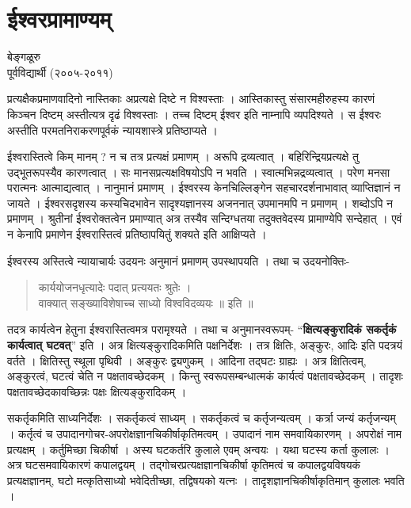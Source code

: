 \chapter{ईश्वरप्रामाण्यम्}

\begin{center}
\smallskip

बेङ्गळूरु\\
पूर्वविद्यार्थी (२००५-२०११)
\end{center}
प्रत्यक्षैकप्रमाणवादिनो नास्तिकाः अप्रत्यक्षे दिष्टे न विश्वस्ताः । आस्तिकास्तु संसारमहीरुहस्य कारणं किञ्चन दिष्टम् अस्तीत्यत्र दृढं विश्वस्ताः । तच्च दिष्टम् ईश्वर इति नाम्नापि व्यपदिश्यते । स ईश्वरः अस्तीति परमतनिराकरणपूर्वकं न्यायशास्त्रे प्रतिष्ठाप्यते ।

ईश्वरास्तित्वे किम् मानम् ? न च तत्र प्रत्यक्षं प्रमाणम् । अरूपि द्रव्यत्वात् । बहिरिन्द्रियप्रत्यक्षे तु उद्भूतरूपस्यैव कारणत्वात् । सः मानसप्रत्यक्षविषयोऽपि न भवति । स्वात्मभिन्नद्रव्यत्वात् । परेण मनसा परात्मनः आत्माद्यत्वात् । नानुमानं प्रमाणम् । ईश्वरस्य केनचिल्लिङ्गेन सहचारदर्शनाभावात् व्याप्तिज्ञानं न जायते । ईश्वरसदृशस्य कस्यचिदभावेन सादृश्यज्ञानस्य अजननात् उपमानमपि न प्रमाणम् । शब्दोऽपि न प्रमाणम् । श्रुतीनां ईश्वरोक्तत्वेन प्रमाण्यात् अत्र तस्यैव सन्दिग्धतया तदुक्तवेदस्य प्रामाण्येपि सन्देहात् । एवं न केनापि प्रमाणेन ईश्वरास्तित्वं प्रतिष्ठापयितुं शक्यते इति आक्षिप्यते ।

ईश्वरस्य अस्तित्वे न्यायाचार्यः उदयनः अनुमानं प्रमाणम् उपस्थापयति । तथा च उदयनोक्तिः-
\begin{verse}
कार्ययोजनधृत्यादेः पदात् प्रत्ययतः श्रुतेः ।\\
वाक्यात् सङ्ख्याविशेषाच्च साध्यो विश्वविदव्ययः ॥ इति ॥
\end{verse}
तदत्र कार्यत्वेन हेतुना ईश्वरास्तित्वमत्र परामृश्यते । तथा च अनुमानस्वरूपम्- “\textbf{क्षित्यङ्कुरादिकं सकर्तृकं कार्यत्वात् घटवत्}” इति । अत्र क्षित्यङ्कुरादिकमिति पक्षनिर्देशः । तत्र क्षितिः, अङ्कुरः, आदिः इति पदत्रयं वर्तते । क्षितिस्तु स्थूला पृथिवी । अङ्कुरः द्व्यणुकम् । आदिना तद्घटः ग्राह्यः । अत्र क्षितित्वम्, अङ्कुरत्वं, घटत्वं चेति न पक्षतावच्छेदकम् । किन्तु स्वरूपसम्बन्धात्मकं कार्यत्वं पक्षतावच्छेदकम् । तादृशः पक्षतावच्छेदकावच्छिन्नः पक्षः क्षित्यङ्कुरादिकम् ।

सकर्तृकमिति साध्यनिर्देशः । सकर्तृकत्वं साध्यम् । सकर्तृकत्वं च कर्तृजन्यत्वम् । कर्त्रा जन्यं कर्तृजन्यम् । कर्तृत्वं च उपादानगोचर-अपरोक्षज्ञानचिकीर्षाकृतिमत्वम् । उपादानं नाम समवायिकारणम् । अपरोक्षं नाम प्रत्यक्षम् । कर्तुमिच्छा चिकीर्षा । अस्य घटकर्तरि कुलाले एवम् अन्वयः । यथा घटस्य कर्ता कुलालः । अत्र घटसमवायिकारणं कपालद्वयम् । तद्गोचरप्रत्यक्षज्ञानचिकीर्षा कृतिमत्वं च कपालद्वयविषयकं प्रत्यक्षज्ञानम्, घटो मत्कृतिसाध्यो भवेदितीच्छा, तद्विषयको यत्नः । तादृशज्ञानचिकीर्षाकृतिमान् कुलालः भवति ।

